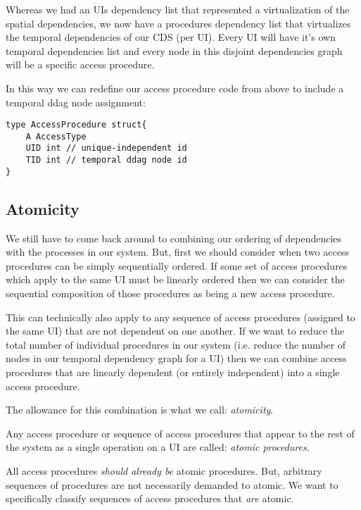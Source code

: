 Whereas we had an UIs dependency list that represented a virtualization of the spatial dependencies, we now have a procedures dependency list that virtualizes the temporal dependencies of our CDS (per UI). Every UI will have it's own temporal dependencies list and every node in this disjoint dependencies graph will be a specific access procedure.

In this way we can redefine our access procedure code from above to include a temporal ddag node assignment:

\begin{verbatim}
type AccessProcedure struct{
	A AccessType
	UID int // unique-independent id
	TID int // temporal ddag node id
}
\end{verbatim}

\subsection{Atomicity}

We still have to come back around to combining our ordering of dependencies with the processes in our system. But, first we should consider when two access procedures can be simply sequentially ordered. If some set of access procedures which apply to the same UI must be linearly ordered then we can consider the sequential composition of those procedures as being a new access procedure.

This can technically also apply to any sequence of access procedures (assigned to the same UI) that are not dependent on one another. If we want to reduce the total number of individual procedures in our system (i.e. reduce the number of nodes in our temporal dependency graph for a UI) then we can combine access procedures that are linearly dependent (or entirely independent) into a single access procedure.

The allowance for this combination is what we call: \textit{atomicity}.

\begin{con-def}
	\label{atomic-procedures}
	Any access procedure or sequence of access procedures that appear to the rest of the system as a single operation on a UI are called: \textit{atomic procedures}.
\end{con-def}

All access procedures \textit{should already be} atomic procedures. But, arbitrary sequences of procedures are not necessarily demanded to atomic. We want to specifically classify sequences of access procedures that \textit{are} atomic.

